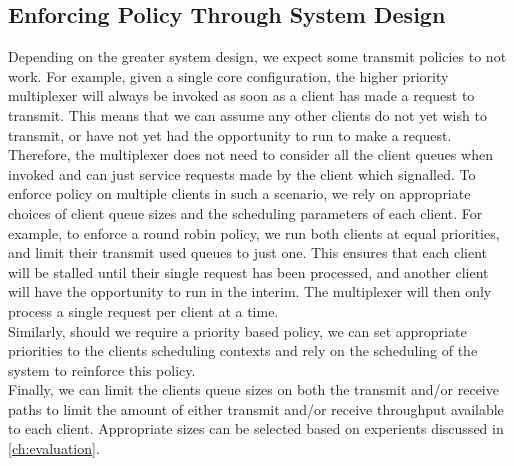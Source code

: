 
\subsection{Enforcing Policy Through System Design}
Depending on the greater system design, we expect some transmit policies to not work.
For example, given a single core configuration, the higher priority multiplexer will
always be invoked as soon as a client has made a request to transmit. This means that
we can assume any other clients do not yet wish to transmit, or have not yet had the
opportunity to run to make a request. Therefore, the multiplexer does not need to 
consider all the client queues when invoked and can just service requests made
by the client which signalled. To enforce policy on multiple clients in such a scenario,
we rely on appropriate choices of client queue sizes and the scheduling parameters
of each client. For example, to enforce a round robin policy, we run both clients
at equal priorities, and limit their transmit used queues to just one. This ensures
that each client will be stalled until their single request has been processed, and
another client will have the opportunity to run in the interim. The multiplexer will
then only process a single request per client at a time.\\
Similarly, should we require a priority based policy, we can set appropriate priorities
to the clients scheduling contexts and rely on the scheduling of the system to reinforce
this policy.\\
Finally, we can limit the clients queue sizes on both the transmit and/or receive paths
to limit the amount of either transmit and/or receive throughput available to each client.
Appropriate sizes can be selected based on experients discussed in \autoref{ch:evaluation}.\\ 

